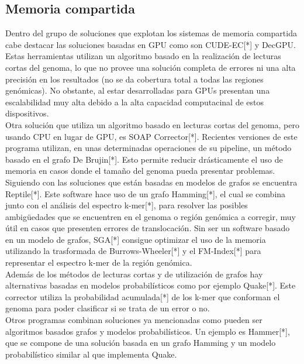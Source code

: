 \documentclass[conference]{IEEEtran}
\begin{document}
\subsection{Memoria compartida}

Dentro del grupo de soluciones que explotan los sistemas de memoria compartida cabe destacar las soluciones basadas en GPU como son CUDE-EC[*] y DecGPU\cite{decgpu}. Estas herramientas utilizan un algoritmo basado en la realización de lecturas cortas del genoma, lo que no provee una solución completa de errores ni una alta precisión en los resultados (no se da cobertura total a todas las regiones genómicas). No obstante, al estar desarrolladas para GPUs presentan una escalabilidad muy alta debido a la alta capacidad computacinal de estos dispositivos.\\

Otra solución que utiliza un algoritmo basado en lecturas cortas del genoma, pero usando CPU en lugar de GPU, es SOAP Corrector[*]. Recientes versiones de este programa utilizan, en unas determinadas operaciones de su pipeline, un método basado en el grafo De Brujin[*]. Esto permite reducir drásticamente el uso de memoria en casos donde el tamaño del genoma pueda presentar problemas.\\

Siguiendo con las soluciones que están basadas en modelos de grafos se encuentra Reptile[*]. Este software hace uso de un grafo Hamming[*], el cual se combina junto con el análisis del espectro k-mer[*], para resolver las posibles ambigüedades que se encuentren en el genoma o región genómica a corregir, muy útil en casos que presenten errores de translocación. Sin ser un software basado en un modelo de grafos, SGA[*] consigue optimizar el uso de la memoria utilizando la trasformada de Burrows-Wheeler[*] y el FM-Index[*] para representar el espectro k-mer de la región genómica.\\

Además de los métodos de lecturas cortas y de utilización de grafos hay alternativas basadas en modelos probabilísticos como por ejemplo Quake[*]. Este corrector utiliza la probabilidad acumulada[*] de los k-mer que conforman el genoma para poder clasificar si se trata de un error o no.\\

Otros programas combinan soluciones ya mencionadas como pueden ser algoritmos basados grafos y modelos probabilísticos. Un ejemplo es Hammer[*], que se compone de una solución basada en un grafo Hamming y un modelo probabilístico similar al que implementa Quake.\\
\end{document}
